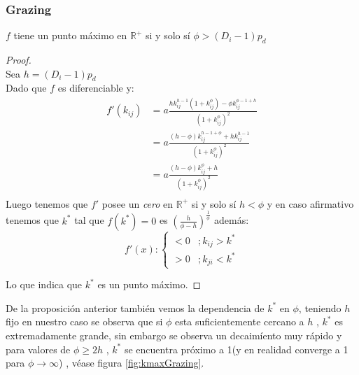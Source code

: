 \subsubsection{Grazing}

\begin{prop}
  $f$ tiene un punto m\'aximo en $\mathbb{R}^+$ si y solo s\'i $\phi > (D_i - 1)p_d$ 
\end{prop}

\begin{proof}
\mbox{}\\
Sea $ h = (D_i-1)p_d$\\
Dado que $f$ es diferenciable y:
  \begin{equation}
    \begin{aligned}
      f'(k_{ij}) &= a \frac{h k_{ij}^{h-1} (1 + k_{ij}^\phi) -\phi k_{ij}^{\phi-1+h}}{(1+k_{ij}^{\phi})^2} \\
            &= a \frac{(h-\phi)k_{ij}^{h-1 + \phi}  + h k_{ij}^{h-1} }{(1+k_{ij}^{\phi})^2}\\
            &= a \frac{(h-\phi)k_{ij}^\phi + h }{(1+k_{ij}^{\phi})^2}\\
     \end{aligned}
  \end{equation}
Luego tenemos que $f'$ posee un \emph{cero} en $\mathbb{R}^+$ si y solo s\'i $ h< \phi$ y en caso afirmativo tenemos que $k^*$ tal que $f(k^*) = 0$ es $(\frac{h}{\phi-h})^{\frac{1}{\phi}}$ adem\'as:
\begin{equation}
  f'(x) :
  \begin{cases}
    < 0 &; k_{ij}  > k^* \\
    > 0 &; k_{ji} < k^*
  \end{cases}
\end{equation}

Lo que indica que $k^*$ es un punto m\'aximo.
\end{proof}

De la proposici\'on anterior tambi\'en vemos la dependencia de $k^*$ en $\phi$, teniendo $h$ fijo en nuestro caso se observa que si $\phi$ esta suficientemente cercano a $h$ , $k^*$ es extremadamente grande, sin embargo se observa un decaim\'iento muy r\'apido y para valores de $\phi \geq 2h$  , $k^*$ se encuentra pr\'oximo a 1(y en realidad converge a 1 para $\phi \to \infty$) , v\'ease figura \ref{fig:kmaxGrazing}. \\

